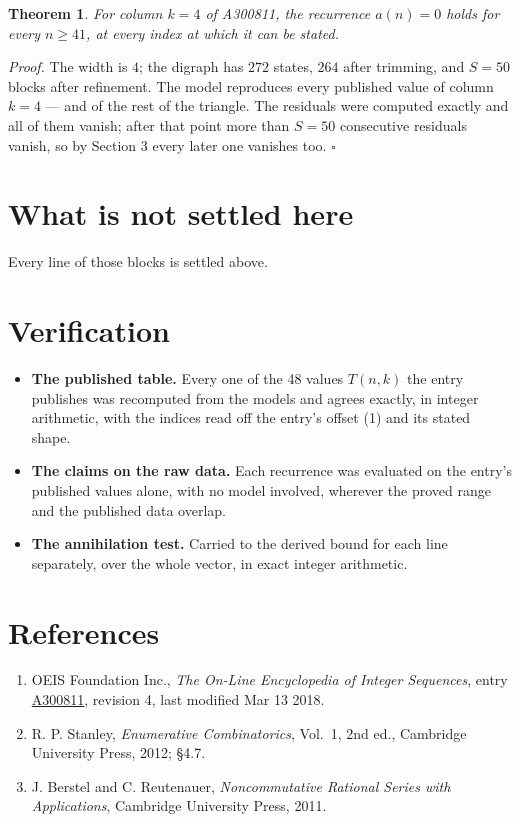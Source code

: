 \documentclass[11pt]{article}
\newtheorem{theorem}{Theorem}
\theoremstyle{definition}
\begin{document}
\begin{theorem} For column $k = 4$ of A300811, the recurrence $a(n) = 0$ holds for every $n \ge 41$, at every index at which it can be stated.\end{theorem}

{\itshape Proof.} The width is $4$; the digraph has $272$ states, $264$ after trimming, and $S = 50$ blocks after refinement. The model reproduces every published value of column $k = 4$ --- and of the rest of the triangle. The residuals were computed exactly and all of them vanish; after that point more than $S = 50$ consecutive residuals vanish, so by Section 3 every later one vanishes too. $\square$

\section{What is not settled here}

Every line of those blocks is settled above.

\section{Verification}

\begin{itemize}

\item {\bfseries The published table.} Every one of the 48 values $T(n,k)$ the entry publishes was recomputed from the models and agrees exactly, in integer arithmetic, with the indices read off the entry's offset (1) and its stated shape.

\item {\bfseries The claims on the raw data.} Each recurrence was evaluated on the entry's published values alone, with no model involved, wherever the proved range and the published data overlap.

\item {\bfseries The annihilation test.} Carried to the derived bound for each line separately, over the whole vector, in exact integer arithmetic.

\end{itemize}

\section{References}

\begin{enumerate}

\item OEIS Foundation Inc., \emph{The On-Line Encyclopedia of Integer Sequences}, entry \href{https://oeis.org/A300811}{A300811}, revision 4, last modified Mar 13 2018.

\item R. P. Stanley, \emph{Enumerative Combinatorics}, Vol.~1, 2nd ed., Cambridge University Press, 2012; \S4.7.

\item J. Berstel and C. Reutenauer, \emph{Noncommutative Rational Series with Applications}, Cambridge University Press, 2011.

\end{enumerate}
\end{document}

